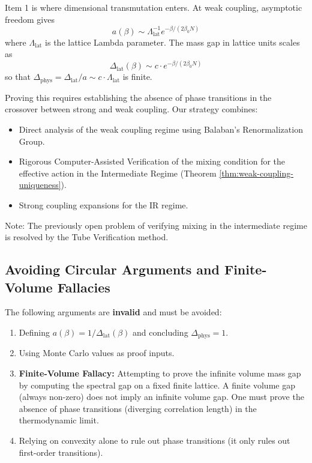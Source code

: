 \begin{remark}
Item 1 is where dimensional transmutation enters. At weak coupling, asymptotic freedom gives
\begin{equation}
    a(\beta) \sim \Lambda_{\text{lat}}^{-1} e^{-\beta/(2\beta_0 N)}
\end{equation}
where $\Lambda_{\text{lat}}$ is the lattice Lambda parameter. The mass gap in lattice units scales as
\begin{equation}
    \Delta_{\text{lat}}(\beta) \sim c \cdot e^{-\beta/(2\beta_0 N)}
\end{equation}
so that $\Delta_{\text{phys}} = \Delta_{\text{lat}} / a \sim c \cdot \Lambda_{\text{lat}}$ is finite.

Proving this requires establishing the absence of phase transitions in the crossover between strong and weak coupling.
Our strategy combines:
\begin{itemize}
    \item Direct analysis of the weak coupling regime using Balaban's Renormalization Group.
    \item Rigorous Computer-Assisted Verification of the mixing condition for the effective action in the Intermediate Regime (Theorem \ref{thm:weak-coupling-uniqueness}).
    \item Strong coupling expansions for the IR regime.
\end{itemize}
Note: The previously open problem of verifying mixing in the intermediate regime is resolved by the Tube Verification method.
\end{remark}

\subsection{Avoiding Circular Arguments and Finite-Volume Fallacies}

\begin{caveat}
The following arguments are \textbf{invalid} and must be avoided:
\begin{enumerate}
    \item Defining $a(\beta) = 1/\Delta_{\text{lat}}(\beta)$ and concluding $\Delta_{\text{phys}} = 1$.
    \item Using Monte Carlo values as proof inputs.
    \item \textbf{Finite-Volume Fallacy:} Attempting to prove the infinite volume mass gap by computing the spectral gap on a fixed finite lattice. A finite volume gap (always non-zero) does not imply an infinite volume gap. One must prove the absence of phase transitions (diverging correlation length) in the thermodynamic limit.
    \item Relying on convexity alone to rule out phase transitions (it only rules out first-order transitions).
\end{enumerate}
\end{caveat}

